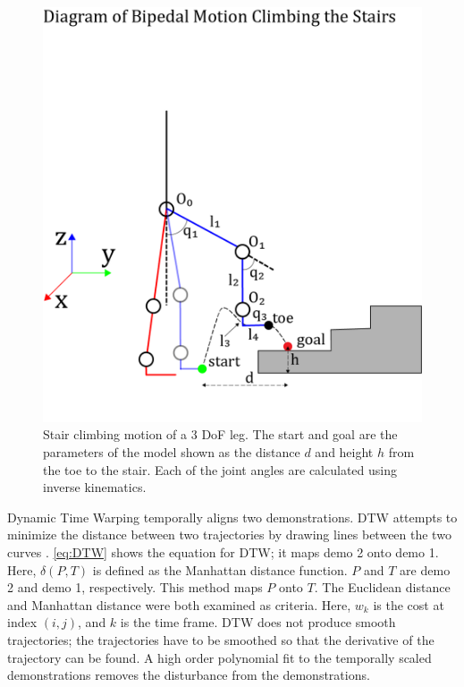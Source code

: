  
\begin{figure} 
    \centering 
    \includegraphics[scale=0.75]{images/stick.png} 
    \caption{Stair climbing motion of a 3 DoF leg. The start and goal are the parameters of the model shown as the distance $d$ and height $h$ from the toe to the stair. Each of the joint angles are calculated using inverse kinematics.} 
    \label{fig:stick} 
    \vspace*{-4mm}
\end{figure} 



Dynamic Time Warping temporally aligns two demonstrations. DTW attempts to minimize the distance between two trajectories by drawing lines between the two curves \cite{muller2007dynamic} \cite{JSSv031i07}. \autoref{eq:DTW} shows the equation for DTW; it maps demo 2 onto demo 1. Here, $\delta (P, T)$ is defined as the Manhattan distance function. $P$ and $T$ are demo 2 and demo 1, respectively. This method maps $P$ onto $T$. The Euclidean distance and Manhattan distance were both examined as criteria. Here, $w_k$ is the cost at index $(i,j)$, and $k$ is the time frame. DTW does not produce smooth trajectories; the trajectories have to be smoothed so that the derivative of the trajectory can be found. A high order polynomial fit to the temporally scaled demonstrations removes the disturbance from the demonstrations.



